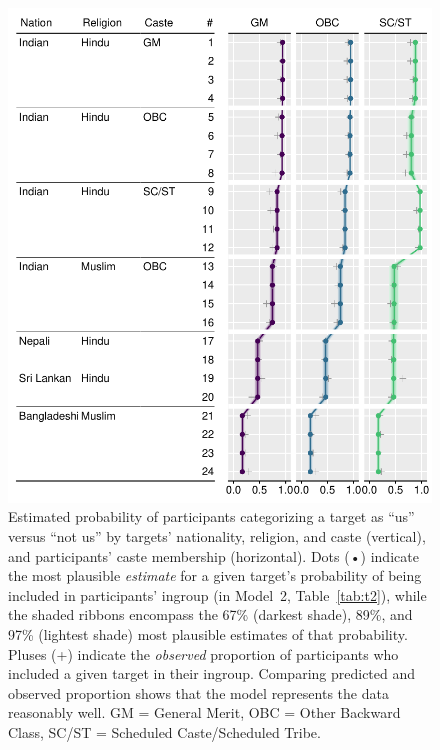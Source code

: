 \documentclass[12pt, a4paper]{article}
\begin{document}
\begin{figure}
\centering
\includegraphics[scale=1]{../figures/figure-3}
\caption{
Estimated probability of participants categorizing a target as ``us'' versus ``not us'' by targets' nationality, religion, and caste (vertical), and participants' caste membership (horizontal). Dots (•) indicate the most plausible \emph{estimate} for a given target's probability of being included in participants' ingroup (in Model~2, Table~\ref{tab:t2}), while the shaded ribbons encompass the 67\% (darkest shade), 89\%, and 97\% (lightest shade) most plausible estimates of that probability. Pluses (+) indicate the \emph{observed} proportion of participants who included a given target in their ingroup. Comparing predicted and observed proportion shows that the model represents the data reasonably well. GM = General Merit, OBC = Other Backward Class, SC/ST = Scheduled Caste/Scheduled Tribe.
}
\label{fig:f3}
\end{figure} 
\end{document}
